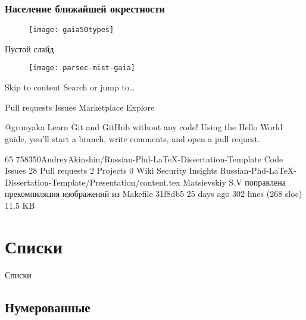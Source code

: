 \begin{frame}
\frametitle{Население ближайшей окрестности}
\begin{figure}[pt]
  \centering
   \texttt{[image: gaia50types]}
\end{figure}
\end{frame}

\begin{frame}
Пустой слайд
\end{frame}

\begin{frame}
\begin{figure}[pt]
  \centering
  \texttt{[image: parsec-mist-gaia]}
\end{figure}
\end{frame}

Skip to content
Search or jump to…

Pull requests
Issues
Marketplace
Explore
 
@grunyaka 
Learn Git and GitHub without any code!
Using the Hello World guide, you’ll start a branch, write comments, and open a pull request.


65
758350AndreyAkinshin/Russian-Phd-LaTeX-Dissertation-Template
 Code Issues 28 Pull requests 2 Projects 0 Wiki Security Insights
Russian-Phd-LaTeX-Dissertation-Template/Presentation/content.tex
 Matsievskiy S.V поправлена прекомпиляция изображений из Makefile
31f8db5 25 days ago
302 lines (268 sloc)  11.5 KB
  
\section{Списки}
\begin{frame}
    \begin{center}
        \Huge
        Списки
    \end{center}
\end{frame}

\subsection{Нумерованные}

